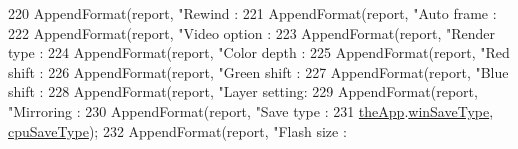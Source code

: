 \begin{DoxyCode}
{{{{{{{{{{{{220   AppendFormat(report, \textcolor{stringliteral}{"Rewind       : %
221   AppendFormat(report, \textcolor{stringliteral}{"Auto frame   : %
222   AppendFormat(report, \textcolor{stringliteral}{"Video option : %
223   AppendFormat(report, \textcolor{stringliteral}{"Render type  : %
224   AppendFormat(report, \textcolor{stringliteral}{"Color depth  : %
225   AppendFormat(report, \textcolor{stringliteral}{"Red shift    : %
226   AppendFormat(report, \textcolor{stringliteral}{"Green shift  : %
227   AppendFormat(report, \textcolor{stringliteral}{"Blue shift   : %
228   AppendFormat(report, \textcolor{stringliteral}{"Layer setting: %
229   AppendFormat(report, \textcolor{stringliteral}{"Mirroring    : %
230   AppendFormat(report, \textcolor{stringliteral}{"Save type    : %
231                \mbox{\hyperlink{_v_b_a_8cpp_a8095a9d06b37a7efe3723f3218ad8fb3}{theApp}}.\mbox{\hyperlink{class_v_b_a_a70060f88010280739406c87ef66d036a}{winSaveType}}, \mbox{\hyperlink{_globals_8cpp_a8a45d318e0d21c0ab6ab1a54b5be74ea}{cpuSaveType}});
232   AppendFormat(report, \textcolor{stringliteral}{"Flash size   : %
}}}}}}}}}}}}}}}}}}}}}}}}
\end{DoxyCode}
